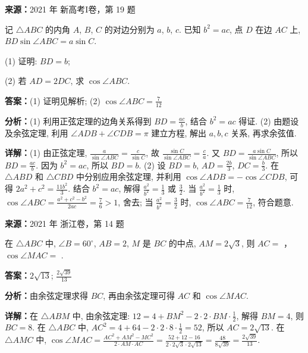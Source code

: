 \begin{question}[points=12]
\textbf{来源：}2021 年 新高考I卷，第 19 题\par
记 $\triangle ABC$ 的内角 $A$, $B$, $C$ 的对边分别为 $a$, $b$, $c$. 已知 $b^2 = ac$, 点 $D$ 在边 $AC$ 上, $BD \sin\angle ABC = a \sin C$.

(1) 证明: $BD = b$;

(2) 若 $AD = 2DC$, 求 $\cos\angle ABC$.
\begin{solution}
\textbf{答案：}(1) 证明见解析; (2) $\cos\angle ABC = \frac{7}{12}$

\textbf{分析：}(1) 利用正弦定理的边角关系得到 $BD = \frac{ac}{b}$, 结合 $b^2 = ac$ 得证. (2) 由题设及余弦定理, 利用 $\angle ADB + \angle CDB = \pi$ 建立方程, 解出 $a,b,c$ 关系, 再求余弦值.

\textbf{详解：}(1) 由正弦定理, $\frac{a}{\sin\angle ABC} = \frac{c}{\sin C}$, 故 $\frac{\sin C}{\sin\angle ABC} = \frac{c}{a}$. 又 $BD = \frac{a\sin C}{\sin\angle ABC}$, 所以 $BD = \frac{ac}{b}$. 因为 $b^2 = ac$, 所以 $BD = b$.
(2) 设 $BD = b$, $AD = \frac{2b}{3}$, $DC = \frac{b}{3}$. 在 $\triangle ABD$ 和 $\triangle CBD$ 中分别应用余弦定理, 并利用 $\cos\angle ADB = -\cos\angle CDB$, 可得 $2a^2 + c^2 = \frac{11b^2}{3}$. 结合 $b^2 = ac$, 解得 $\frac{a^2}{b^2} = \frac{1}{3}$ 或 $\frac{3}{2}$. 当 $\frac{a^2}{b^2} = \frac{1}{3}$ 时, $\cos\angle ABC = \frac{a^2 + c^2 - b^2}{2ac} = \frac{7}{6} > 1$, 舍去; 当 $\frac{a^2}{b^2} = \frac{3}{2}$ 时, $\cos\angle ABC = \frac{7}{12}$, 符合题意.
\end{solution}
\end{question}

\begin{question}[points=6]
\textbf{来源：}2021 年 浙江卷，第 14 题\par
在 $\triangle ABC$ 中, $\angle B = 60^\circ$, $AB=2$, $M$ 是 $BC$ 的中点, $AM=2\sqrt{3}$, 则 $AC=$ ，$\cos\angle MAC=$ .
\begin{solution}
\textbf{答案：}$2\sqrt{13}$; $\frac{2\sqrt{39}}{13}$

\textbf{分析：}由余弦定理求得 $BC$, 再由余弦定理可得 $AC$ 和 $\cos\angle MAC$.

\textbf{详解：}在 $\triangle ABM$ 中, 由余弦定理: $12=4+BM^2-2\cdot2\cdot BM\cdot\frac12$, 解得 $BM=4$, 则 $BC=8$. 在 $\triangle ABC$ 中, $AC^2=4+64-2\cdot2\cdot8\cdot\frac12=52$, 所以 $AC=2\sqrt{13}$. 在 $\triangle AMC$ 中, $\cos\angle MAC = \frac{AC^2+AM^2-MC^2}{2\cdot AM\cdot AC} = \frac{52+12-16}{2\cdot2\sqrt{3}\cdot2\sqrt{13}} = \frac{48}{8\sqrt{39}} = \frac{2\sqrt{39}}{13}$.
\end{solution}
\end{question}


